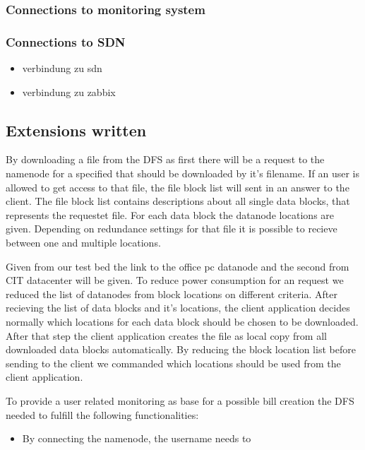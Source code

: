 \subsubsection{Connections to monitoring system}



\subsubsection{Connections to SDN}

\begin{itemize}
\item verbindung zu sdn
\item verbindung zu zabbix
\end{itemize}

\subsection{Extensions written}

By downloading a file from the DFS as first there will be a request to the namenode for a specified that should be downloaded by it's filename. If an user is allowed to get access to that file, the file block list will sent in an answer to the client. The file block list contains descriptions about all single data blocks, that represents the requestet file. For each data block the datanode locations are given. Depending on redundance settings for that file it is possible to recieve between one and multiple locations. 

Given from our test bed the link to the office pc datanode and the second from CIT datacenter will be given. To reduce power consumption for an request we reduced the list of datanodes from block locations on different criteria. After recieving the list of data blocks and it's locations, the client application decides normally which locations for each data block should be chosen to be downloaded. After that step the client application creates the file as local copy from all downloaded data blocks automatically. By reducing the block location list before sending to the client we commanded which locations should be used from the client application.



To provide a user related monitoring as base for a possible bill creation the DFS needed to fulfill the following functionalities:

\begin{itemize}
\item By connecting the namenode, the username needs to 
\end{itemize}

